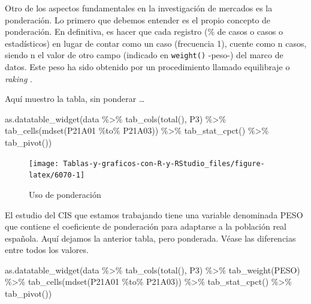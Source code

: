 \documentclass[
]{book}
\newenvironment{Shaded}{\begin{snugshade}}{\end{snugshade}}
\newcommand{\FunctionTok}[1]{\textcolor[rgb]{0.00,0.00,0.00}{#1}}
\newcommand{\NormalTok}[1]{#1}
\newcommand{\SpecialCharTok}[1]{\textcolor[rgb]{0.00,0.00,0.00}{#1}}
\begin{document}
Otro de los aspectos fundamentales en la investigación de mercados es la ponderación. Lo primero que debemos entender es el propio concepto de ponderación. En definitiva, es hacer que cada registro (\% de casos o casos o estadísticos) en lugar de contar como un caso (frecuencia 1), cuente como n casos, siendo n el valor de otro campo (indicado en \texttt{weight()} -peso-) del marco de datos. Este peso ha sido obtenido por un procedimiento llamado equilibraje o \emph{raking} \citep{biemer2008weighting}.

Aquí muestro la tabla, sin ponderar \ldots{}

\begin{Shaded}
\begin{Highlighting}[]
\FunctionTok{as.datatable\_widget}\NormalTok{(data }\SpecialCharTok{\%\textgreater{}\%}
  \FunctionTok{tab\_cols}\NormalTok{(}\FunctionTok{total}\NormalTok{(), P3) }\SpecialCharTok{\%\textgreater{}\%}
  \FunctionTok{tab\_cells}\NormalTok{(}\FunctionTok{mdset}\NormalTok{(P21A01 }\SpecialCharTok{\%to\%}\NormalTok{ P21A03)) }\SpecialCharTok{\%\textgreater{}\%}
  \FunctionTok{tab\_stat\_cpct}\NormalTok{() }\SpecialCharTok{\%\textgreater{}\%}
  \FunctionTok{tab\_pivot}\NormalTok{())}
\end{Highlighting}
\end{Shaded}

\begin{figure}[H]

{\centering \texttt{[image: Tablas-y-graficos-con-R-y-RStudio\_files/figure-latex/6070-1]} 

}

\caption{Uso de ponderación}\label{fig:6070}
\end{figure}

El estudio del CIS que estamos trabajando tiene una variable denominada PESO que contiene el coeficiente de ponderación para adaptarse a la población real española. Aquí dejamos la anterior tabla, pero ponderada. Véase las diferencias entre todos los valores.

\begin{Shaded}
\begin{Highlighting}[]
\FunctionTok{as.datatable\_widget}\NormalTok{(data }\SpecialCharTok{\%\textgreater{}\%}
  \FunctionTok{tab\_cols}\NormalTok{(}\FunctionTok{total}\NormalTok{(), P3) }\SpecialCharTok{\%\textgreater{}\%}
  \FunctionTok{tab\_weight}\NormalTok{(PESO) }\SpecialCharTok{\%\textgreater{}\%}
  \FunctionTok{tab\_cells}\NormalTok{(}\FunctionTok{mdset}\NormalTok{(P21A01 }\SpecialCharTok{\%to\%}\NormalTok{ P21A03)) }\SpecialCharTok{\%\textgreater{}\%}
  \FunctionTok{tab\_stat\_cpct}\NormalTok{() }\SpecialCharTok{\%\textgreater{}\%}
  \FunctionTok{tab\_pivot}\NormalTok{())}
\end{Highlighting}
\end{Shaded}
\end{document}
